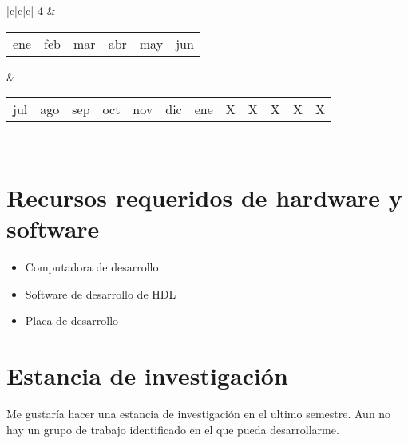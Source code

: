 \documentclass[runningheads,a4paper]{llncs}
\begin{document}
\begin{table}
\begin{center}
\begin{tabular}{|c|c|c|}
4 & 
    \begin{tabular}{c|c|c|c|c|c}
        ene & feb & mar & abr & may & jun\\
    \end{tabular} &
    \begin{tabular}{c|c|c|c|c|c|c|c|c|c|c|c}
        jul & ago & sep & oct & nov & dic & ene & X & X & X & X & X\\
    \end{tabular}\\\hline

\end{tabular}
\end{center}
\end{table}

\section{Recursos requeridos de hardware y software}
\begin{itemize}
\item Computadora de desarrollo
\item Software de desarrollo de HDL
\item Placa de desarrollo
 \end{itemize}



\section{Estancia de investigación}
Me gustaría hacer una estancia de investigación en el ultimo semestre. Aun no hay un grupo de trabajo identificado en el que pueda desarrollarme.
\end{document}
